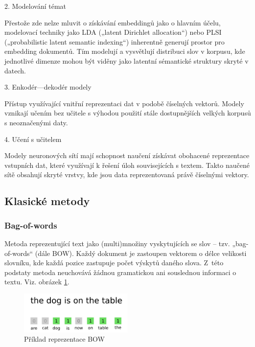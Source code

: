 \documentclass[thesis=M,czech]{FITthesis}[2019/12/23]
\begin{document}
2.	Modelování témat

Přestože zde nelze mluvit o získávání embeddingů jako o hlavním účelu, modelovací techniky jako LDA („latent Dirichlet allocation“) nebo PLSI („probabilistic latent semantic indexing“) inherentně generují prostor pro embedding dokumentů. Tím modelují a vysvětlují distribuci slov v korpusu, kde jednotlivé dimenze mohou být viděny jako latentní sémantické struktury skryté v datech.

3.	Enkodér---dekodér modely

Přístup využívající vnitřní reprezentaci dat v podobě číselných vektorů. Modely vznikají učením bez učitele s výhodou použití stále dostupnějších velkých korpusů s neoznačenými daty.

4.	Učení s učitelem

Modely neuronových sítí mají schopnost naučení získávat obohacené reprezentace vstupních dat, které využívají k řešení úloh souvisejících s textem. Takto naučené sítě obsahují skryté vrstvy, kde jsou data reprezentovaná právě číselnými vektory.

\subsection{Klasické metody}
\subsubsection{Bag-of-words}
Metoda reprezentující text jako (multi)množiny vyskytujících se slov -- tzv. „bag-of-words“ (dále BOW). Každý dokument je zastoupen vektorem o délce velikosti slovníku, kde každá pozice zastupuje počet výskytů daného slova. Z~této podstaty metoda neuchovává žádnou gramatickou ani souslednou informaci o textu. Viz. obrázek \ref{fig:palachy2019BOW}.
\begin{figure}\centering
	\includegraphics[width=0.5\textwidth]{images/palachy2019/palachy2019_BOW.png}
	\caption{Příklad reprezentace BOW\cite{palachy2019}}\label{fig:palachy2019BOW}
\end{figure}
\end{document}
